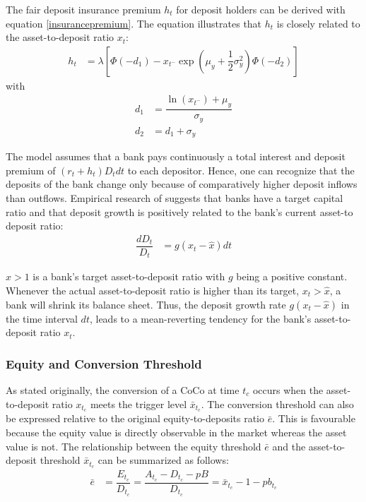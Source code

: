 The fair deposit insurance premium $h_t$ for deposit holders can be derived with equation \ref{insurancepremium}. The equation illustrates that $h_t$ is closely related to the asset-to-deposit ratio $x_t$:
\begin{align} \label{insurancepremium}
 h_t &=  \lambda \left[ \Phi\left( -d_1 \right) - x_{t^{-}} \exp\left( \mu_y + \dfrac{1}{2} \sigma_y^2 \right) \Phi\left( -d_2 \right)    \right]
\end{align}
with
\begin{align}
d_1 &= \dfrac{\ln\left( x_{t^{-}}\right) + \mu_y}{\sigma_y}\\
d_2 &= d_1 + \sigma_y
\end{align}

The model assumes that a bank pays continuously a total interest and deposit premium of $\left( r_t + h_t \right) D_t dt$ to each depositor. Hence, one can recognize that the deposits of the bank change only because of comparatively higher deposit inflows than outflows. Empirical research of \citet{adrian2010liquidity} suggests that banks have a target capital ratio and that deposit growth is positively related to the bank's current asset-to deposit ratio:
\begin{align}\label{depositgrowthprocess}
\dfrac{dD_t}{D_t} &= g\left(x_t -\hat{x} \right)dt
\end{align}

$\hat{x} > 1$ is a bank's target asset-to-deposit ratio with $g$ being a positive constant. Whenever the actual asset-to-deposit ratio is higher than its target, $x_t > \hat{x}$, a bank will shrink its balance sheet. Thus, the deposit growth rate $g\left( x_t - \hat{x} \right)$ in the time interval $dt$, leads to a mean-reverting tendency for the bank's asset-to-deposit ratio $x_t$.

\subsubsection*{Equity and Conversion Threshold}

As stated originally, the conversion of a CoCo at time $t_c$ occurs when the asset-to-deposit ratio $x_{t_c}$ meets the trigger level $\bar{x}_{t_c}$. The conversion threshold can also be expressed relative to the original equity-to-deposits ratio $\bar{e}$. This is favourable because the equity value is directly observable in the market whereas the asset value is not. The relationship between the equity threshold $\bar{e}$ and the asset-to-deposit threshold $\bar{x}_{t_c}$ can be summarized as follows:
\begin{align}
\bar{e} &= \dfrac{E_{t_c}}{D_{t_c}} = \dfrac{A_{t_c} - D_{t_c} - pB}{D_{t_c}} = \bar{x}_{t_c} - 1 - p b_{t_c}
\end{align}

